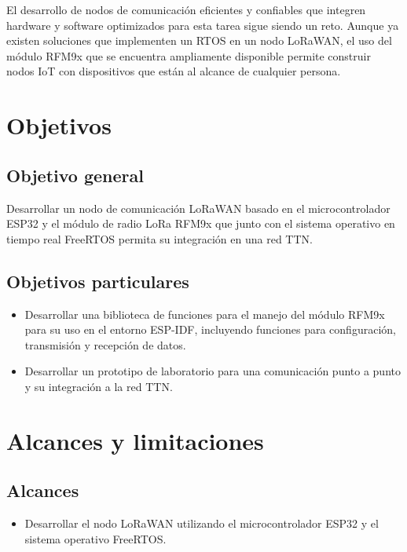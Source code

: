 \vspace{0.5cm}

El desarrollo de nodos de comunicación eficientes y confiables que integren hardware y software optimizados para esta tarea sigue siendo un reto. Aunque ya existen soluciones que implementen un RTOS en un nodo LoRaWAN, el uso del módulo RFM9x que se encuentra ampliamente disponible permite construir nodos IoT con dispositivos que están al alcance de cualquier persona. 

\section{Objetivos}

\subsection{Objetivo general}

Desarrollar un nodo de comunicación LoRaWAN basado en el microcontrolador ESP32 y el módulo de radio LoRa RFM9x que junto con el sistema operativo en tiempo real FreeRTOS permita su integración en una red TTN.


\subsection{Objetivos particulares}

\begin{itemize}
   \item Desarrollar una biblioteca de funciones para el manejo del módulo RFM9x para su uso en el entorno ESP-IDF, incluyendo funciones para configuración, transmisión y recepción de datos.
   \item Desarrollar un prototipo de laboratorio para una comunicación punto a punto y su integración a la red TTN.
\end{itemize}


\section{Alcances y limitaciones}

\subsection{Alcances}

\begin{itemize}
   \item Desarrollar el nodo LoRaWAN utilizando el microcontrolador ESP32 y el sistema operativo FreeRTOS.
\end{itemize}


